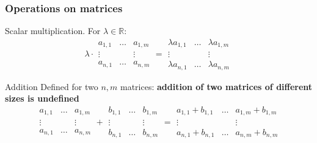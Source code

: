 \documentclass{beamer}
\begin{document}
\begin{frame}
  \frametitle{Operations on matrices}

  \begin{block}{Scalar multiplication.}
    For $\lambda \in \mathbb{R}$:
    \[
    \lambda \cdot
    \begin{array}{|ccc|}
    a_{1,1} & \dots & a_{1,m}\\ \vdots & & \vdots\\ a_{n,1} & \dots & a_{n, m}
    \end{array} =
    \begin{array}{|ccc|}
      \lambda a_{1,1} & \dots & \lambda a_{1,m}\\ \vdots & & \vdots\\ \lambda a_{n,1} & \dots & \lambda a_{n, m}
    \end{array}
    \]
  \end{block}

  \begin{block}{Addition}
    Defined for two $n,m$ matrices: \alert{\textbf{addition of two matrices of different sizes is undefined}}
    \[
    \begin{array}{|ccc|}
      a_{1,1} & \dots & a_{1,m}\\ \vdots & & \vdots\\ a_{n,1} & \dots & a_{n, m}
    \end{array}
    +
    \begin{array}{|ccc|}
      b_{1,1} & \dots & b_{1,m}\\ \vdots & & \vdots\\ b_{n,1} & \dots & b_{n, m}
    \end{array}
    =
    \begin{array}{|ccc|}
      a_{1,1} + b_{1,1} & \dots & a_{1,m} + b_{1,m}\\ \vdots & & \vdots\\ a_{n,1} + b_{n,1} & \dots & a_{n, m} + b_{n,m}
    \end{array}
    \]
  \end{block}
  
\end{frame}
\end{document}
